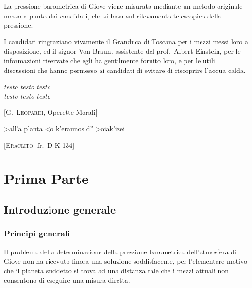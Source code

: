 \documentclass[%
    corpo=11.5pt,
    twoside,
    evenboxes,
    tipotesi=triennale,
    stile=classica,
    oldstyle,
    autoretitolo,
    greek,
]{toptesi}
\begin{document}
%

\sommario

La pressione barometrica di Giove viene misurata
mediante un metodo originale  messo a punto dai candidati, che si basa
sul rilevamento telescopico della pressione.


\ringraziamenti

I candidati ringraziano vivamente il Granduca di Toscana per i mezzi
messi loro a disposizione, ed il signor Von Braun, assistente del
prof.~Albert Einstein, per le informazioni riservate che egli ha
gentilmente fornito loro, e per le utili discussioni che hanno permesso
ai candidati di evitare di riscoprire l'acqua calda.

\tablespagetrue\figurespagetrue %
\indici

\ifclassica   
\begin{citazioni}
        \textit{testo testo testo\\testo testo testo}

        [\textsc{G.\ Leopardi}, Operette Morali]

        \textgreek{>all'a p'anta <o k'eraunos d'' >oiak'izei}

        [\textsc{Eraclito}, fr.\ D-K 134]
    \end{citazioni}

\fi
\mainmatter

\part{Prima Parte}
\chapter{Introduzione generale}

\section{Principi generali}
Il problema della determinazione della pressione barometrica dell'atmosfera di Giove non ha ricevuto finora una soluzione soddisfacente, per l'elementare motivo che il pianeta suddetto si trova ad una distanza tale che i mezzi attuali non consentono di eseguire una misura diretta.
\end{document}
